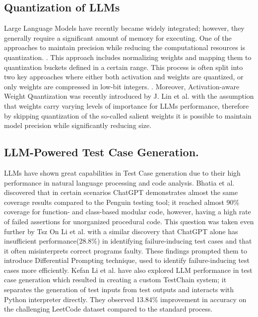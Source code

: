\documentclass[conference]{IEEEtran}
\begin{document}
\subsection{Quantization of LLMs} Large Language Models have recently became widely integrated; however, they generally require a significant amount of memory for executing. One of the approaches to maintain precision while reducing the computational resources is quantization. \cite{dettmers2022llmint88bitmatrixmultiplication}. This approach includes normalizing weights and mapping them to quantization buckets defined in a certain range\cite{dettmers2022llmint88bitmatrixmultiplication}. This process is often split into two key approaches where either both activation and weights are quantized, or only weights are compressed in low-bit integers. \cite{dettmers2022llmint88bitmatrixmultiplication}. Moreover, Activation-aware Weight Quantization was recently introduced by J. Lin et al. \cite{linAWQActivationawareWeight2024} with the assumption that weights carry varying levels of importance for LLMs performance, therefore by skipping quantization of the so-called salient weights it is possible to maintain model precision while significantly reducing size.

\subsection{LLM-Powered Test Case Generation.
}
LLMs have shown great capabilities in Test Case generation due to their high performance in natural language processing and code analysis. Bhatia et al. \cite{bhatiaUnitTestGeneration2024} discovered that in certain scenarios ChatGPT demonstrates almost the same coverage results compared to the Penguin testing tool; it reached almost 90\% coverage for function- and class-based modular code, however, having a high rate of failed assertions for unorganized procedural code. This question was taken even further by Tsz On Li et al. \cite{li2023nuanceskeyunlockingchatgpt} with a similar discovery that ChatGPT alone has insufficient performance(28.8\%) in identifying failure-inducing test cases and that it often misinterprets correct programs faulty. These findings prompted them to introduce Differential Prompting technique, \cite{li2023nuanceskeyunlockingchatgpt} used to identify failure-inducing test cases more efficiently. Kefan Li et al. have also explored LLM performance in test case generation which resulted in creating a custom TestChain system; it separates the generation of test inputs from test outputs and interacts with Python interpreter directly. They observed 13.84\% improvement in accuracy on the challenging LeetCode dataset compared to the standard process. \cite{li2024largelanguagemodelstest}
\end{document}
